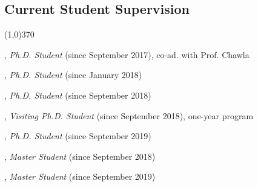 \documentclass[10pt]{article}
\newenvironment{myindentpar}[1]%
{\begin{list}{}%
         {\setlength{\leftmargin}{#1}}%
         \item[]%
}
{\end{list}}
\newcounter{list}
\newcommand{\hide}[1]{}
\begin{document}
\subsection{\sc Current Student Supervision}
\vspace{-0.4cm} \line(1,0){370} \vspace{-0.1cm}

\begin{myindentpar}{0.75cm}

\hspace{-0.75cm}{\bf Daheng Wang}, \emph{Ph.D. Student} (since September 2017), co-ad. with Prof. Chawla

\hspace{-0.75cm}{\bf Qingkai Zeng}, \emph{Ph.D. Student} (since January 2018)

\hspace{-0.75cm}{\bf Tong Zhao}, \emph{Ph.D. Student} (since September 2018)

\hspace{-0.75cm}{\bf Tianwen Jiang}, \emph{Visiting Ph.D. Student} (since September 2018), one-year program

\hspace{-0.75cm}{\bf Wenhao Yu}, \emph{Ph.D. Student} (since September 2019)

\hspace{-0.75cm}{\bf Yifan Ding}, \emph{Master Student} (since September 2018)

\hspace{-0.75cm}{\bf Jiaming Li}, \emph{Master Student} (since September 2019)

\end{myindentpar}

\hide{
\subsection{\sc Media Coverage}
\vspace{-0.4cm} \line(1,0){370} \vspace{-0.1cm}

\begin{myindentpar}{0.75cm}
{\em With modern media, press coverage sometimes spreads far and wide. There are often more outlets reporting than can be captured. This section therefore lists only a representative article (or two) of the total press coverage.}

\hspace{-0.75cm} XXX (XXX 2019) 
\hspace{0.75cm}{\em XXX}

\hspace{-0.75cm} XXX (XXX 2019) 

\url{https://www.XXX.com/}

\end{myindentpar}
}
\end{document}
